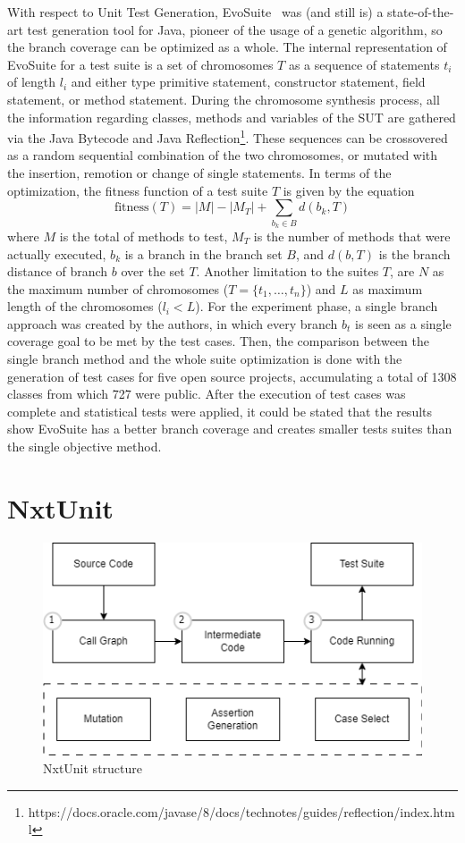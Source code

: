 \documentclass[%
  chapterprefix=false,%
  open=right,%
  twoside=true,%
  paper=a4,%
  logofile={Figures/logo.png},%
  thesistype=master,%
  UKenglish,%
]{se2thesis}
\begin{document}
With respect to Unit Test Generation, EvoSuite~\cite{DBLP:conf/qsic/FraserA11} was (and still is) a state-of-the-art test generation tool for Java, pioneer of the usage of a genetic algorithm, so the branch coverage can be optimized as a whole.
The internal representation of EvoSuite for a test suite is a set of chromosomes \(T\) as a sequence of statements \(t_i\) of length \(l_i\) and either type primitive statement, constructor statement, field statement, or method statement.
During the chromosome synthesis process, all the information regarding classes, methods and variables of the SUT are gathered via the Java Bytecode and Java Reflection\footnote{https://docs.oracle.com/javase/8/docs/technotes/guides/reflection/index.html}.
These sequences can be crossovered as a random sequential combination of the two chromosomes, or mutated with the insertion, remotion or change of single statements.
In terms of the optimization, the fitness function of a test suite $T$ is given by the equation
\[ \text{fitness}(T) = |M| - |M_T| + \sum_{b_k \in B} d(b_k, T) \]
where $M$ is the total of methods to test, \(M_T\) is the number of methods that were actually executed, \(b_k\) is a branch in the branch set \(B\), and \(d(b, T)\) is the branch distance of branch \(b\) over the set \(T\).
Another limitation to the suites \(T\), are \(N\) as the maximum number of chromosomes (\(T = \{t_1, \dots , t_n\}\)) and \(L\) as maximum length of the chromosomes (\(l_i < L\)).
For the experiment phase, a single branch approach was created by the authors, in which every branch \(b_t\) is seen as a single coverage goal to be met by the test cases.
Then, the comparison between the single branch method and the whole suite optimization is done with the generation of test cases for five open source projects, accumulating a total of 1308 classes from which 727 were public.
After the execution of test cases was complete and statistical tests were applied, it could be stated that the results show EvoSuite has a better branch coverage and creates smaller tests suites than the single objective method.

\section{NxtUnit}

\begin{figure}[bt]
  \centering
  \includegraphics[width=.99\textwidth]{Figures/nxtunit2.png}
  \caption{NxtUnit structure}\label{fig:nxt}
\end{figure}
\end{document}
